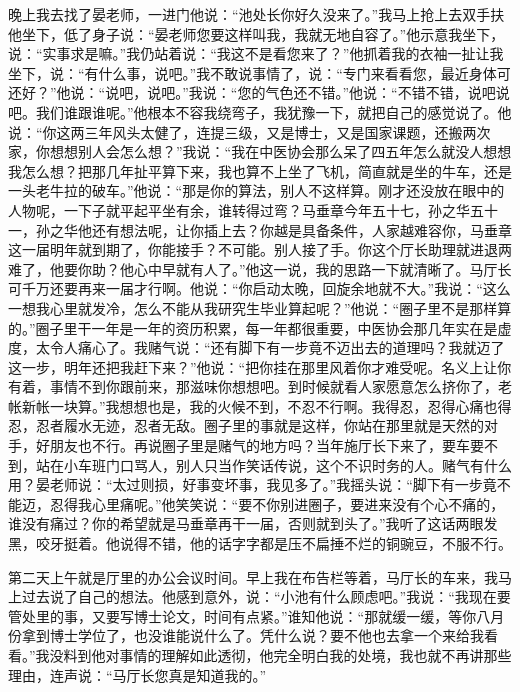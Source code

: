 \documentclass[12pt,oneside]{book}
\begin{document}
晚上我去找了晏老师，一进门他说：``池处长你好久没来了。''我马上抢上去双手扶他坐下，低了身子说：``晏老师您要这样叫我，我就无地自容了。''他示意我坐下，说：``实事求是嘛。''我仍站着说：``我这不是看您来了？''他抓着我的衣袖一扯让我坐下，说：``有什么事，说吧。''我不敢说事情了，说：``专门来看看您，最近身体可还好？''他说：``说吧，说吧。''我说：``您的气色还不错。''他说：``不错不错，说吧说吧。我们谁跟谁呢。''他根本不容我绕弯子，我犹豫一下，就把自己的感觉说了。他说：``你这两三年风头太健了，连提三级，又是博士，又是国家课题，还搬两次家，你想想别人会怎么想？''我说：``我在中医协会那么呆了四五年怎么就没人想想我怎么想？把那几年扯平算下来，我也算不上坐了飞机，简直就是坐的牛车，还是一头老牛拉的破车。''他说：``那是你的算法，别人不这样算。刚才还没放在眼中的人物呢，一下子就平起平坐有余，谁转得过弯？马垂章今年五十七，孙之华五十一，孙之华他还有想法呢，让你插上去？你越是具备条件，人家越难容你，马垂章这一届明年就到期了，你能接手？不可能。别人接了手。你这个厅长助理就进退两难了，他要你助？他心中早就有人了。''他这一说，我的思路一下就清晰了。马厅长可千万还要再来一届才行啊。他说：``你启动太晚，回旋余地就不大。''我说：``这么一想我心里就发冷，怎么不能从我研究生毕业算起呢？''他说：``圈子里不是那样算的。''圈子里干一年是一年的资历积累，每一年都很重要，中医协会那几年实在是虚度，太令人痛心了。我赌气说：``还有脚下有一步竟不迈出去的道理吗？我就迈了这一步，明年还把我赶下来？''他说：``把你挂在那里风着你才难受呢。名义上让你有着，事情不到你跟前来，那滋味你想想吧。到时候就看人家愿意怎么挤你了，老帐新帐一块算。''我想想也是，我的火候不到，不忍不行啊。我得忍，忍得心痛也得忍，忍者履水无迹，忍者无敌。圈子里的事就是这样，你站在那里就是天然的对手，好朋友也不行。再说圈子里是赌气的地方吗？当年施厅长下来了，要车要不到，站在小车班门口骂人，别人只当作笑话传说，这个不识时务的人。赌气有什么用？晏老师说：``太过则损，好事变坏事，我见多了。''我摇头说：``脚下有一步竟不能迈，忍得我心里痛呢。''他笑笑说：``要不你别进圈子，要进来没有个心不痛的，谁没有痛过？你的希望就是马垂章再干一届，否则就到头了。''我听了这话两眼发黑，咬牙挺着。他说得不错，他的话字字都是压不扁捶不烂的铜豌豆，不服不行。

第二天上午就是厅里的办公会议时间。早上我在布告栏等着，马厅长的车来，我马上过去说了自己的想法。他感到意外，说：``小池有什么顾虑吧。''我说：``我现在要管处里的事，又要写博士论文，时间有点紧。''谁知他说：``那就缓一缓，等你八月份拿到博士学位了，也没谁能说什么了。凭什么说？要不他也去拿一个来给我看看。''我没料到他对事情的理解如此透彻，他完全明白我的处境，我也就不再讲那些理由，连声说：``马厅长您真是知道我的。''
\end{document}
